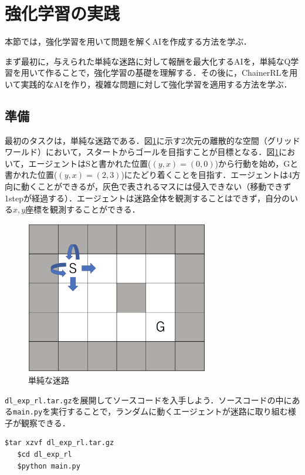  \section{強化学習の実践}

 本節では，強化学習を用いて問題を解くAIを作成する方法を学ぶ．

 まず最初に，与えられた単純な迷路に対して報酬を最大化するAIを，単純なQ学習を用いて作ることで，強化学習の基礎を理解する．その後に，ChainerRLを用いて実践的なAIを作り，複雑な問題に対して強化学習を適用する方法を学ぶ．

  \subsection{準備}

  最初のタスクは，単純な迷路である．図\ref{fig:env1}に示す2次元の離散的な空間（グリッドワールド）において，スタートからゴールを目指すことが目標となる．図\ref{fig:env1}において，エージェントはSと書かれた位置($(y, x) = (0, 0)$)から行動を始め，Gと書かれた位置($(y, x) = (2, 3)$)にたどり着くことを目指す．エージェントは4方向に動くことができるが，灰色で表されるマスには侵入できない（移動できず1stepが経過する）．エージェントは迷路全体を観測することはできず，自分のいる$x, y$座標を観測することができる．

  \begin{figure}[htb]
   \centering
   \includegraphics[width=80mm]{images/TsuruokaLab/env1.eps}
   \caption{単純な迷路}
   \label{fig:env1}
  \end{figure}

  \verb+dl_exp_rl.tar.gz+を展開してソースコードを入手しよう．ソースコードの中にある\verb+main.py+を実行することで，ランダムに動くエージェントが迷路に取り組む様子が観察できる．

  \newpage

  \begin{lstlisting}[basicstyle=\ttfamily\footnotesize, frame=single]
   $tar xzvf dl_exp_rl.tar.gz
   $cd dl_exp_rl
   $python main.py
  \end{lstlisting}


